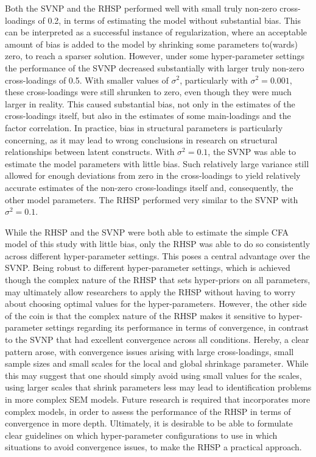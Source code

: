 \documentclass[]{interact}
\theoremstyle{plain}%
\theoremstyle{definition}
\theoremstyle{remark}
\begin{document}
Both the SVNP and the RHSP performed well with small truly non-zero
cross-loadings of 0.2, in terms of estimating the model without
substantial bias. This can be interpreted as a successful instance of
regularization, where an acceptable amount of bias is added to the model
by shrinking some parameters to(wards) zero, to reach a sparser
solution. However, under some hyper-parameter settings the performance
of the SVNP decreased substantially with larger truly non-zero
cross-loadings of 0.5. With smaller values of \(\sigma^2\), particularly
with \(\sigma^2 = 0.001\), these cross-loadings were still shrunken to
zero, even though they were much larger in reality. This caused
substantial bias, not only in the estimates of the cross-loadings
itself, but also in the estimates of some main-loadings and the factor
correlation. In practice, bias in structural parameters is particularly
concerning, as it may lead to wrong conclusions in research on
structural relationships between latent constructs. With
\(\sigma^2 = 0.1\), the SVNP was able to estimate the model parameters
with little bias. Such relatively large variance still allowed for
enough deviations from zero in the cross-loadings to yield relatively
accurate estimates of the non-zero cross-loadings itself and,
consequently, the other model parameters. The RHSP performed very
similar to the SVNP with \(\sigma^2 = 0.1\).

While the RHSP and the SVNP were both able to estimate the simple CFA
model of this study with little bias, only the RHSP was able to do so
consistently across different hyper-parameter settings. This poses a
central advantage over the SVNP. Being robust to different
hyper-parameter settings, which is achieved though the complex nature of
the RHSP that sets hyper-priors on all parameters, may ultimately allow
researchers to apply the RHSP without having to worry about choosing
optimal values for the hyper-parameters. However, the other side of the
coin is that the complex nature of the RHSP makes it sensitive to
hyper-parameter settings regarding its performance in terms of
convergence, in contrast to the SVNP that had excellent convergence
across all conditions. Hereby, a clear pattern arose, with convergence
issues arising with large cross-loadings, small sample sizes and small
scales for the local and global shrinkage parameter. While this may
suggest that one should simply avoid using small values for the scales,
using larger scales that shrink parameters less may lead to
identification problems in more complex SEM models. Future research is
required that incorporates more complex models, in order to assess the
performance of the RHSP in terms of convergence in more depth.
Ultimately, it is desirable to be able to formulate clear guidelines on
which hyper-parameter configurations to use in which situations to avoid
convergence issues, to make the RHSP a practical approach.
\end{document}
